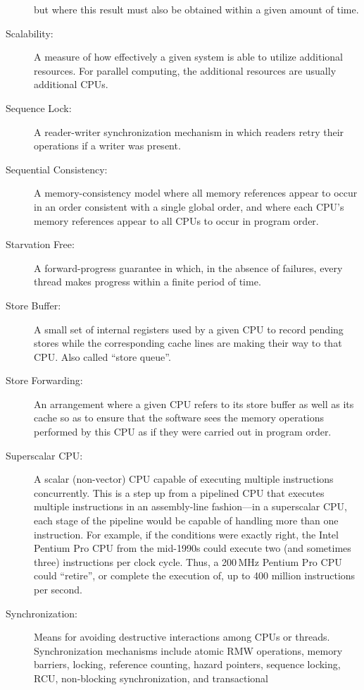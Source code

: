 \begin{description}
	but where this result must also be obtained within a given amount
	of time.
\item[Scalability:]
	A measure of how effectively a given system is able to utilize
	additional resources.
	For parallel computing, the additional resources are usually
	additional CPUs.
\item[Sequence Lock:]
	A reader-writer synchronization mechanism in which readers
	retry their operations if a writer was present.
\item[Sequential Consistency:]
	A memory-consistency model where all memory references appear to occur
	in an order consistent with
	a single global order, and where each CPU's memory references
	appear to all CPUs to occur in program order.
\item[Starvation Free:]
	A forward-progress guarantee in which, in the absence of
	failures, every thread makes progress within a finite
	period of time.
\item[Store Buffer:]
	A small set of internal registers used by a given CPU
	to record pending stores
	while the corresponding cache lines are making their
	way to that CPU.
	Also called ``store queue''.
\item[Store Forwarding:]
	An arrangement where a given CPU refers to its store buffer
	as well as its cache so as to ensure that the software sees
	the memory operations performed by this CPU as if they
	were carried out in program order.
\item[Superscalar CPU:]
	A scalar (non-vector) CPU capable of executing multiple instructions
	concurrently.
	This is a step up from a pipelined CPU that executes multiple
	instructions in an assembly-line fashion---in a superscalar
	CPU, each stage of the pipeline would be capable of handling
	more than one instruction.
	For example, if the conditions were exactly right,
	the Intel Pentium Pro CPU from the mid-1990s could
	execute two (and sometimes three) instructions per clock cycle.
	Thus, a 200\,MHz Pentium Pro CPU could ``retire'', or complete the
	execution of, up to 400 million instructions per second.
\item[Synchronization:]
	Means for avoiding destructive interactions among CPUs or threads.
	Synchronization mechanisms include atomic RMW operations, memory
	barriers, locking, reference counting, hazard pointers, sequence
	locking, RCU, non-blocking synchronization, and transactional

\end{description}
